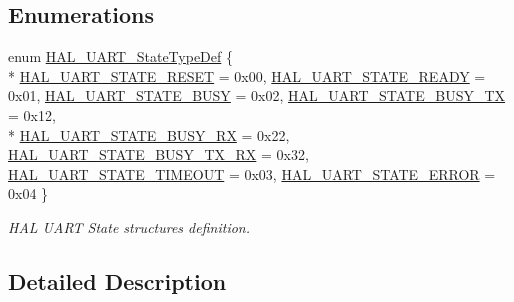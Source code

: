\subsection*{Enumerations}
\begin{DoxyCompactItemize}
\item 
enum \hyperlink{group___u_a_r_t___exported___types_gaf55d844a35379c204c90be5d1e8e50ba}{H\-A\-L\-\_\-\-U\-A\-R\-T\-\_\-\-State\-Type\-Def} \{ \\*
\hyperlink{group___u_a_r_t___exported___types_ggaf55d844a35379c204c90be5d1e8e50baa9c7d889fce61ccc717228d099a61d113}{H\-A\-L\-\_\-\-U\-A\-R\-T\-\_\-\-S\-T\-A\-T\-E\-\_\-\-R\-E\-S\-E\-T} = 0x00, 
\hyperlink{group___u_a_r_t___exported___types_ggaf55d844a35379c204c90be5d1e8e50baade763629c1bdb4f08e52ef79d6e0900e}{H\-A\-L\-\_\-\-U\-A\-R\-T\-\_\-\-S\-T\-A\-T\-E\-\_\-\-R\-E\-A\-D\-Y} = 0x01, 
\hyperlink{group___u_a_r_t___exported___types_ggaf55d844a35379c204c90be5d1e8e50baad1eddce038ba828e8b4061a33a2d8801}{H\-A\-L\-\_\-\-U\-A\-R\-T\-\_\-\-S\-T\-A\-T\-E\-\_\-\-B\-U\-S\-Y} = 0x02, 
\hyperlink{group___u_a_r_t___exported___types_ggaf55d844a35379c204c90be5d1e8e50baadc97ca42e9b05a08cb98e6721e27e80c}{H\-A\-L\-\_\-\-U\-A\-R\-T\-\_\-\-S\-T\-A\-T\-E\-\_\-\-B\-U\-S\-Y\-\_\-\-T\-X} = 0x12, 
\\*
\hyperlink{group___u_a_r_t___exported___types_ggaf55d844a35379c204c90be5d1e8e50baaf7929f7aebd6b450c25907904411680b}{H\-A\-L\-\_\-\-U\-A\-R\-T\-\_\-\-S\-T\-A\-T\-E\-\_\-\-B\-U\-S\-Y\-\_\-\-R\-X} = 0x22, 
\hyperlink{group___u_a_r_t___exported___types_ggaf55d844a35379c204c90be5d1e8e50baa2fdde93f9f55972b7133bf7c75dd2e8a}{H\-A\-L\-\_\-\-U\-A\-R\-T\-\_\-\-S\-T\-A\-T\-E\-\_\-\-B\-U\-S\-Y\-\_\-\-T\-X\-\_\-\-R\-X} = 0x32, 
\hyperlink{group___u_a_r_t___exported___types_ggaf55d844a35379c204c90be5d1e8e50baa90891eeb767df19780e620a15bec807d}{H\-A\-L\-\_\-\-U\-A\-R\-T\-\_\-\-S\-T\-A\-T\-E\-\_\-\-T\-I\-M\-E\-O\-U\-T} = 0x03, 
\hyperlink{group___u_a_r_t___exported___types_ggaf55d844a35379c204c90be5d1e8e50baa5d50bfe0750db02c4fd03d778c8c318c}{H\-A\-L\-\_\-\-U\-A\-R\-T\-\_\-\-S\-T\-A\-T\-E\-\_\-\-E\-R\-R\-O\-R} = 0x04
 \}
\begin{DoxyCompactList}\small\item\em H\-A\-L U\-A\-R\-T State structures definition. \end{DoxyCompactList}\end{DoxyCompactItemize}


\subsection{Detailed Description}


